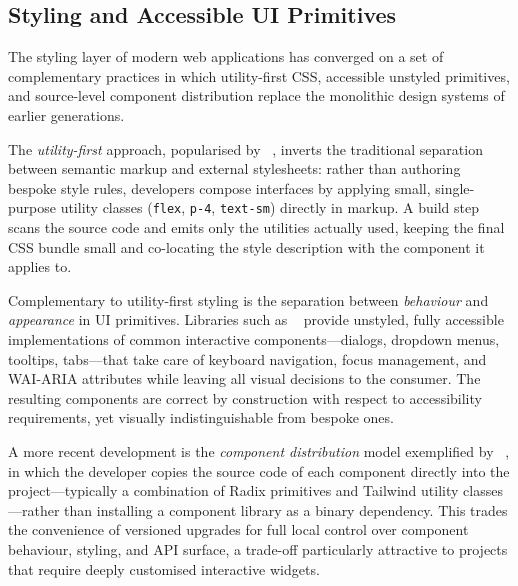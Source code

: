 \subsection{Styling and Accessible UI Primitives}\label{subsec:styling-ui}

The styling layer of modern web applications has converged on a set of complementary practices in which utility-first CSS, accessible unstyled primitives, and source-level component distribution replace the monolithic design systems of earlier generations.

The \emph{utility-first} approach, popularised by \tailwind{}~\cite{tailwindcss}, inverts the traditional separation between semantic markup and external stylesheets: rather than authoring bespoke style rules, developers compose interfaces by applying small, single-purpose utility classes (\texttt{flex}, \texttt{p-4}, \texttt{text-sm}) directly in markup. A build step scans the source code and emits only the utilities actually used, keeping the final CSS bundle small and co-locating the style description with the component it applies to.

Complementary to utility-first styling is the separation between \emph{behaviour} and \emph{appearance} in UI primitives. Libraries such as \radixui{}~\cite{radixui} provide unstyled, fully accessible implementations of common interactive components---dialogs, dropdown menus, tooltips, tabs---that take care of keyboard navigation, focus management, and WAI-ARIA attributes while leaving all visual decisions to the consumer. The resulting components are correct by construction with respect to accessibility requirements, yet visually indistinguishable from bespoke ones.

A more recent development is the \emph{component distribution} model exemplified by \shadcnui{}~\cite{shadcnui}, in which the developer copies the source code of each component directly into the project---typically a combination of Radix primitives and Tailwind utility classes---rather than installing a component library as a binary dependency. This trades the convenience of versioned upgrades for full local control over component behaviour, styling, and API surface, a trade-off particularly attractive to projects that require deeply customised interactive widgets.
